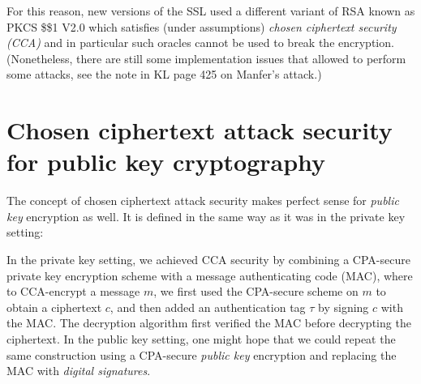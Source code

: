 For this reason, new versions of the SSL used a different variant of RSA
known as PKCS \$\sharp\$1 V2.0 which satisfies (under assumptions)
\emph{chosen ciphertext security (CCA)} and in particular such oracles
cannot be used to break the encryption. (Nonetheless, there are still
some implementation issues that allowed to perform some attacks, see the
note in KL page 425 on Manfer's attack.)

\section{Chosen ciphertext attack security for public key
cryptography}\label{14-Chosen-ciphertext-atta}

The concept of chosen ciphertext attack security makes perfect sense for
\emph{public key} encryption as well. It is defined in the same way as
it was in the private key setting:

\hypertarget{CCSpubdef}{}

In the private key setting, we achieved CCA security by combining a
CPA-secure private key encryption scheme with a message authenticating
code (MAC), where to CCA-encrypt a message \(m\), we first used the
CPA-secure scheme on \(m\) to obtain a ciphertext \(c\), and then added
an authentication tag \(\tau\) by signing \(c\) with the MAC. The
decryption algorithm first verified the MAC before decrypting the
ciphertext. In the public key setting, one might hope that we could
repeat the same construction using a CPA-secure \emph{public key}
encryption and replacing the MAC with \emph{digital signatures}.

